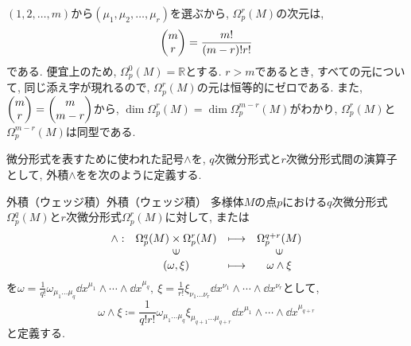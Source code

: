 \documentclass[../main.tex]{subfiles}
\begin{document}
    $(1,2,\ldots,m)$から$(\mu_1,\mu_2,\ldots,\mu_r)$を選ぶから, $\Omega_p^r(M)$の次元は,
    \begin{equation}
        \mqty(m \\ r) = \frac{m!}{(m-r)!r!}
    \end{equation}
    である. 便宜上のため, $\Omega_p^0(M)=\mathbb{R}$とする. $r>m$であるとき, すべての元について, 同じ添え字が現れるので, $\Omega_p^r(M)$の元は恒等的にゼロである.
    また, $\mqty(m \\ r) = \mqty(m \\ m-r)$から, $\dim\Omega_p^r(M)=\dim\Omega_p^{m-r}(M)$がわかり, $\Omega_p^r(M)$と$\Omega_p^{m-r}(M)$は同型である.

    微分形式を表すために使われた記号$\wedge$を, $q$次微分形式と$r$次微分形式間の演算子として, 外積$\wedge$をを次のように定義する.
    \begin{dfn}{外積（ウェッジ積）}{外積（ウェッジ積）}
        多様体$M$の点$p$における$q$次微分形式$\Omega_p^q(M)$と$r$次微分形式$\Omega_p^r(M)$に対して,
        または
        \begin{equation}
            \begin{array}{cccc}
                \wedge:
                    & \Omega_p^q(M)\times\Omega_p^r(M)
                        & \longmapsto & \Omega_p^{q+r}(M) \\
                    & \rotatebox{90}{$\in$} & & \rotatebox{90}{$\in$} \\
                    &(\omega,\xi) &\longmapsto & \omega \wedge \xi
            \end{array}
        \end{equation}
        を$\displaystyle
            \omega = \frac{1}{q!}\omega_{\mu_1\ldots\mu_q}
                        \dd{x}^{\mu_1} \wedge \cdots \wedge \dd{x}^{\mu_q},\
            \xi = \frac{1}{r!}\xi_{\nu_1\ldots\nu_r}
                        \dd{x}^{\nu_1} \wedge \cdots \wedge \dd{x}^{\nu_r}
        $として,
        \begin{equation}
            \omega\wedge\xi \coloneqq\frac{1}{q!r!}
                \omega_{\mu_1\ldots\mu_q}\xi_{\mu_{q+1}\ldots\mu_{q+r}}
                    \dd{x}^{\mu_1} \wedge \cdots \wedge \dd{x}^{\mu_{q+r}}
        \end{equation}
        と定義する.
    \end{dfn}
\end{document}
